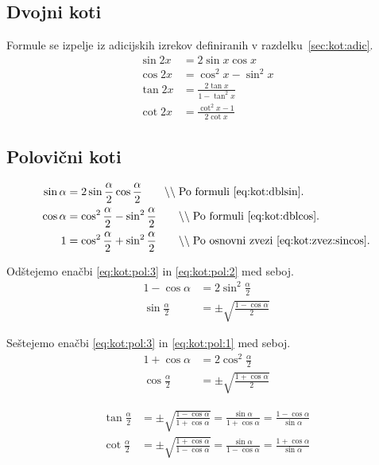 \documentclass[a4paper,oneside,12pt,fleqn]{article}
\newcommand{\comment}[1]{\ensuremath{\qquad\backslash\backslash\;}\textnormal{#1}}
\def\kos{\cos}
\numberwithin{equation}{section}
\begin{document}
\subsection{Dvojni koti}
Formule se izpelje iz adicijskih izrekov definiranih v razdelku~\ref{sec:kot:adic}.
\begin{align}
  \sin2x &= 2\sin{x}\kos{x} \label{eq:kot:dblsin} \\
  \kos2x &= \kos^2x - \sin^2x \label{eq:kot:dblcos} \\
  \tan2x &= \frac{2\tan{x}}{1-\tan^2x} \nonumber \\
  \cot2x &= \frac{\cot^2x-1}{2\cot{x}} \nonumber
\end{align}

\subsection{Polovični koti}
\label{sec:kot:polov}

\begin{align}
  \sin\alpha &= 2\sin\frac{\alpha}{2}\kos\frac{\alpha}{2} 
  \comment{Po formuli \eqref{eq:kot:dblsin}.} \label{eq:kot:pol:1} \\
  \kos\alpha &= \kos^2\frac{\alpha}{2} - \sin^2\frac{\alpha}{2}
  \comment{Po formuli \eqref{eq:kot:dblcos}.} \label{eq:kot:pol:2} \\
  1 &= \kos^2\frac{\alpha}{2} + \sin^2\frac{\alpha}{2} 
  \comment{Po osnovni zvezi \eqref{eq:kot:zvez:sincos}.} \label{eq:kot:pol:3}
\end{align}

Odštejemo enačbi \eqref{eq:kot:pol:3} in \eqref{eq:kot:pol:2} med seboj.
\begin{align*}
  1 - \kos\alpha &= 2\sin^2\frac{\alpha}{2} \\
  \sin\frac{\alpha}{2} &= \pm\sqrt{\frac{1-\kos\alpha}{2}}
\end{align*}

Seštejemo enačbi \eqref{eq:kot:pol:3} in \eqref{eq:kot:pol:1} med seboj.
\begin{align*}
  1 + \kos\alpha &= 2\kos^2\frac{\alpha}{2} \\
  \kos\frac{\alpha}{2} &= \pm\sqrt{\frac{1+\kos\alpha}{2}}
\end{align*}

\begin{align*}
  \tan\frac{\alpha}{2} &= \pm\sqrt{\frac{1-\kos\alpha}{1+\kos\alpha}} =
  \frac{\sin\alpha}{1+\kos\alpha} = \frac{1-\kos\alpha}{\sin\alpha} \\
  \cot\frac{\alpha}{2} &= \pm\sqrt{\frac{1+\kos\alpha}{1-\kos\alpha}} =
  \frac{\sin\alpha}{1-\kos\alpha} = \frac{1+\kos\alpha}{\sin\alpha} \\
\end{align*}
\end{document}
